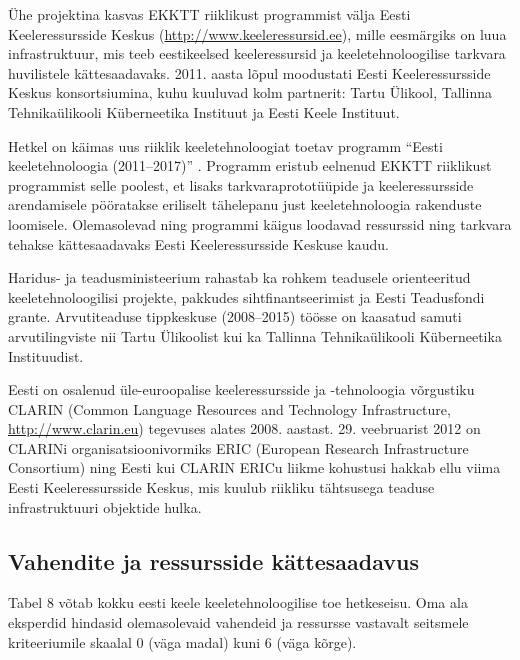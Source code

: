 \documentclass[]{../metanetpaper}
\begin{document}
\begin{multicols}{2}
Ühe projektina kasvas EKKTT riiklikust programmist välja Eesti
Keeleressursside Keskus (\url{http://www.keeleressursid.ee}), mille
eesmärgiks on luua infrastruktuur, mis teeb eestikeelsed
keeleressursid ja keeletehnoloogilise tarkvara huvilistele
kättesaadavaks. 2011. aasta lõpul moodustati Eesti Keeleressursside
Keskus konsortsiumina, kuhu kuuluvad kolm partnerit: Tartu Ülikool,
Tallinna Tehnikaülikooli Küberneetika Instituut ja Eesti Keele
Instituut. 

Hetkel on käimas uus riiklik keeletehnoloogiat toetav programm ``Eesti keeletehnoloogia (2011--2017)'' \cite{ekktt2}. 
Programm eristub eelnenud EKKTT riiklikust programmist selle poolest, et lisaks tarkvaraprototüüpide ja keeleressursside arendamisele pööratakse eriliselt tähelepanu just keeletehnoloogia rakenduste loomisele. Olemasolevad ning programmi käigus loodavad ressurssid ning tarkvara tehakse kättesaadavaks Eesti Keeleressursside Keskuse kaudu.

Haridus- ja teadusministeerium rahastab ka rohkem  teadusele orienteeritud keele\-tehnoloogilisi projekte, pakkudes siht\-finant\-seerimist ja Eesti Teadusfondi grante. 
Arvutiteaduse tippkeskuse (2008--2015) töösse on kaasatud samuti arvutilingviste  nii Tartu Ülikoolist kui ka Tallinna Tehnika\-ülikooli Küberneetika Instituudist.

Eesti on osalenud üle-euroopalise keeleressursside ja -tehnoloogia võrgustiku CLARIN (Common Language Resources and Technology Infrastructure, \url{http://www.clarin.eu}) tegevuses alates 2008. aastast. 29. veebruarist 2012 on CLARINi organisatsioonivormiks ERIC (European Research Infrastructure Consortium) ning Eesti kui CLARIN ERICu liikme kohustusi hakkab ellu viima Eesti Keeleressursside Keskus, mis kuulub riikliku tähtsusega teaduse infrastruktuuri objektide hulka.

\subsection{Vahendite ja ressursside kättesaadavus}

Tabel 8 võtab kokku eesti keele keeletehnoloogilise toe hetkeseisu. 
Oma ala eksperdid hindasid olemasolevaid vahendeid ja ressursse vastavalt seitsmele kriteeriumile skaalal 0 (väga madal) kuni 6 (väga kõrge). 


\end{multicols}
\end{document}
